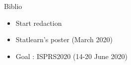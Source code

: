 \documentclass[aspectratio=1610,usenames,dvipsnames]{beamer}
\begin{document}
\begin{frame}{Biblio}
    \begin{itemize}
        \item Start redaction
        \item Statlearn's poster (March 2020)
        \item Goal : ISPRS2020 (14-20 June 2020)
    \end{itemize}
\end{frame}

\end{document}

